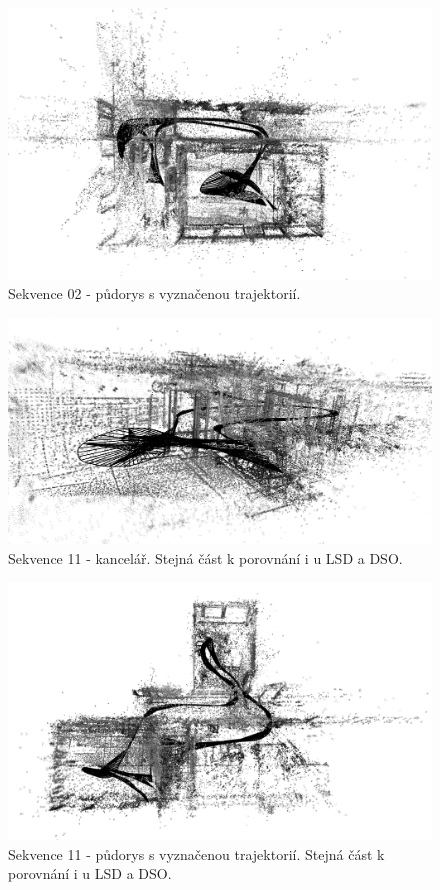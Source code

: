 \documentclass[12pt,a4paper]{report}
\begin{document}
\begin{figure}[H]
\centering
\includegraphics[width=1\textwidth]{img/LDSO_02_top_b.png}
\caption{Sekvence 02 - půdorys s vyznačenou trajektorií.}
\end{figure}

\begin{figure}[H]
\centering
\includegraphics[width=1\textwidth]{img/LDSO_kancl_b.png}
\caption{Sekvence 11 - kancelář. Stejná část k porovnání i u LSD a DSO.}
\end{figure}

\begin{figure}[H]
\centering
\includegraphics[width=1\textwidth]{img/LDSO_11_top_b.png}
\caption{Sekvence 11 - půdorys s vyznačenou trajektorií. Stejná část k porovnání i u LSD a DSO.}
\end{figure}
\end{document}
